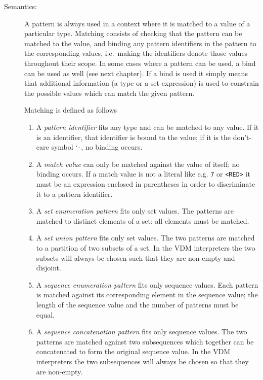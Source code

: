 \documentclass{overturerepchap}
\newcommand{\Lit}[1]{`{\tt #1}\Quote}
\begin{document}
\begin{description}
\item[Semantics:] A pattern is always used in a context where it is matched
  to a value of a particular type. Matching consists of checking that the
  pattern can be matched to the value, and binding any pattern identifiers
  in the pattern to the corresponding values, i.e.\ making the identifiers
  denote those values throughout their scope. In some cases where a pattern
  can be used, a bind can be used as well (see next chapter). If a bind is
  used it simply means that additional information (a type or a set
  expression) is used to constrain the possible values which can match the
  given pattern. 

  Matching is defined as follows
  \begin{enumerate}
  \item A {\it pattern identifier} fits any type and can be matched to any
    value. If it is an identifier, that identifier is bound to the value;
    if it is the don't-care symbol \Lit{-}, no binding occurs.

  \item A {\it match value} can only be matched against the value of
    itself; no binding occurs. If a match value is not a literal like e.g.
    {\tt 7} or {\tt <RED>} it must be an expression enclosed in parentheses in order to
    discriminate it to a pattern identifier.

  \item A {\it set enumeration pattern} fits only set values. The patterns
    are matched to distinct elements of a set; all elements must be
    matched.

  \item A {\it set union pattern} fits only set values. The two patterns
    are matched to a partition of two subsets of a set. In the VDM interpreters
    the two subsets will always be chosen such that they are non-empty
    and disjoint.

  \item A {\it sequence enumeration pattern} fits only sequence values.
    Each pattern is matched against its corresponding element in the
    sequence value; the length of the sequence value and the number of
    patterns must be equal.

  \item A {\it sequence concatenation pattern} fits only sequence values.
    The two patterns are matched against two subsequences which together
    can be concatenated to form the original sequence value. In the
    VDM interpreters the two subsequences will always be chosen so that they
    are non-empty.


\end{enumerate}
\end{description}
\end{document}
